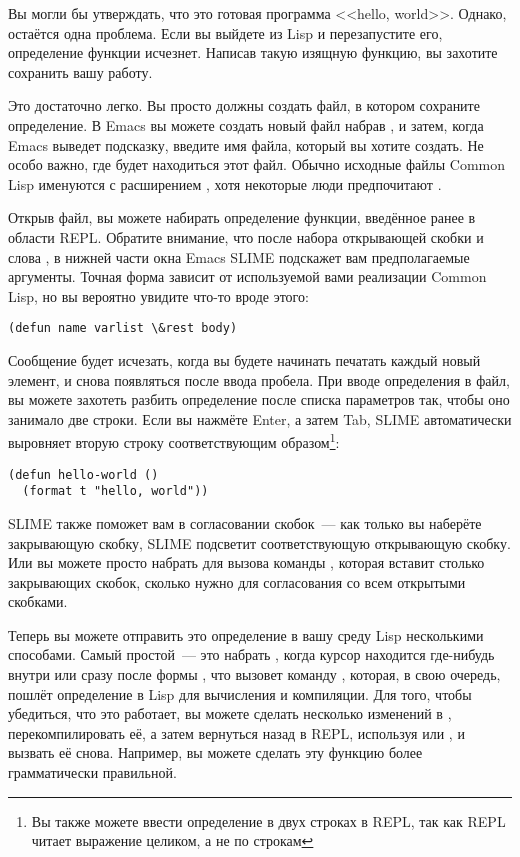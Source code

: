 Вы могли бы утверждать, что это готовая программа <<hello, world>>. Однако, остаётся одна
проблема. Если вы выйдете из Lisp и перезапустите его, определение функции
исчезнет. Написав такую изящную функцию, вы захотите сохранить вашу работу.

Это достаточно легко. Вы просто должны создать файл, в котором сохраните определение. В
Emacs вы можете создать новый файл набрав , и затем, когда Emacs выведет подсказку,
введите имя файла, который вы хотите создать. Не особо важно, где будет находиться этот
файл. Обычно исходные файлы Common Lisp именуются с расширением , хотя некоторые люди
предпочитают .

Открыв файл, вы можете набирать определение функции, введённое ранее в области
REPL. Обратите внимание, что после набора открывающей скобки и слова , в нижней части
окна Emacs SLIME подскажет вам предполагаемые аргументы. Точная форма зависит от
используемой вами реализации Common Lisp, но вы вероятно увидите что-то вроде этого:

\begin{lstlisting}
(defun name varlist \&rest body)
\end{lstlisting}

Сообщение будет исчезать, когда вы будете начинать печатать каждый новый элемент, и снова
появляться после ввода пробела. При вводе определения в файл, вы можете захотеть разбить
определение после списка параметров так, чтобы оно занимало две строки. Если вы нажмёте
Enter, а затем Tab, SLIME автоматически выровняет вторую строку соответствующим
образом\footnote{Вы также можете ввести определение в двух строках в REPL, так как REPL
  читает выражение целиком, а не по строкам}:

\begin{lstlisting}
(defun hello-world ()
  (format t "hello, world"))
\end{lstlisting}

SLIME также поможет вам в согласовании скобок~--- как только вы наберёте закрывающую
скобку, SLIME подсветит соответствующую открывающую скобку. Или вы можете просто набрать
 для вызова команды , которая вставит столько
закрывающих скобок, сколько нужно для согласования со всем открытыми скобками.

Теперь вы можете отправить это определение в вашу среду Lisp несколькими способами. Самый
простой~--- это набрать , когда курсор находится где-нибудь внутри или сразу после
формы , что вызовет команду , которая, в свою очередь, пошлёт
определение в Lisp для вычисления и компиляции. Для того, чтобы убедиться, что это
работает, вы можете сделать несколько изменений в , перекомпилировать её, а
затем вернуться назад в REPL, используя  или , и вызвать её снова. Например,
вы можете сделать эту функцию более грамматически правильной.

